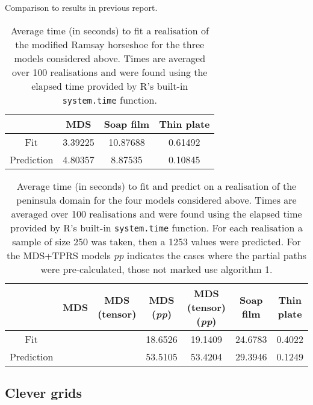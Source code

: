 \documentclass[a4paper,10pt]{article}
\begin{document}
Comparison to results in previous report.


\begin{table}[ht]
\centering
\begin{tabular}{c || c c c}
 & MDS & Soap film & Thin plate\\ 
\hline
Fit & 3.39225 & 10.87688 & 0.61492\\
Prediction & 4.80357 & 8.87535 & 0.10845\\
\end{tabular}
\label{ramsaytime}
\caption{Average time (in seconds) to fit a realisation of the modified Ramsay horseshoe for the three models considered above. Times are averaged over 100 realisations and were found using the elapsed time provided by \textsf{R}'s built-in \texttt{system.time} function.}
\end{table}


\begin{table}[ht]
\centering
\begin{tabular}{c || c c c c c c}
 & MDS & MDS (tensor) & MDS (\textit{pp})& MDS (tensor) (\textit{pp})& Soap film & Thin plate\\ 
\hline
Fit & & & 18.6526 & 19.1409 & 24.6783 & 0.4022\\ 
Prediction & & & 53.5105 & 53.4204 & 29.3946 & 0.1249\\
\end{tabular}
\label{wt2time}
\caption{Average time (in seconds) to fit and predict on a realisation of the peninsula domain for the four models considered above. Times are averaged over 100 realisations and were found using the elapsed time provided by \textsf{R}'s built-in \texttt{system.time} function. For each realisation a sample of size 250 was taken, then a 1253 values were predicted. For the MDS+TPRS models \textit{pp} indicates the cases where the partial paths were pre-calculated, those not marked use algorithm 1.}
\end{table}










\subsection{Clever grids}
\end{document}
